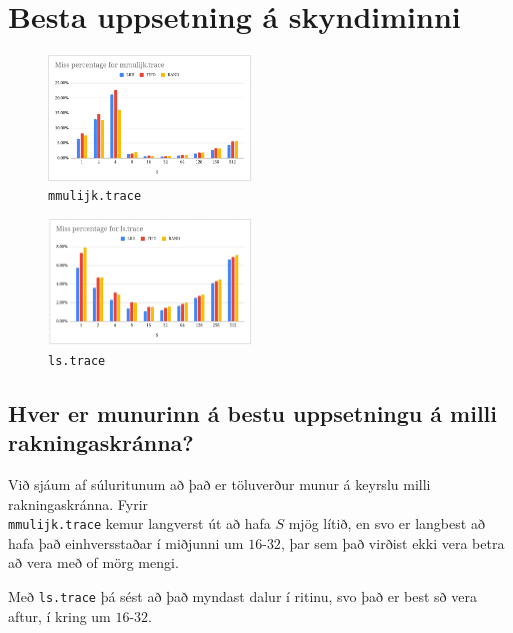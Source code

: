 \documentclass{article}
\begin{document}
	\newpage
	\section{Besta uppsetning á skyndiminni}
	\begin{multicols}{2}
	\begin{figure}[H]
		\begin{center}
			\includegraphics[width=0.48\textwidth]{mmul.png}
		\end{center}
		\caption{\texttt{mmulijk.trace}}\label{fig:mmul}
	\end{figure}
	\begin{figure}[H]
		\begin{center}
			\includegraphics[width=0.48\textwidth]{ls.png}
		\end{center}
		\caption{\texttt{ls.trace}}\label{fig:ls}
	\end{figure}
	\end{multicols}
	
	\subsection{Hver er munurinn á bestu uppsetningu á milli 
	rakningaskránna?}
	Við sjáum af súluritunum að það er töluverður munur á keyrslu milli 
	rakningaskránna. Fyrir \\ \texttt{mmulijk.trace} kemur langverst út að 
	hafa $S$ mjög lítið, en svo er langbest að hafa það einhversstaðar 
	í miðjunni um $16$-$32$, þar sem það virðist ekki vera betra að vera 
	með of mörg mengi. 

	Með \texttt{ls.trace} þá sést að það myndast dalur í 
	ritinu, svo það er best sð vera aftur, í kring um $16$-$32$. 
\end{document}
